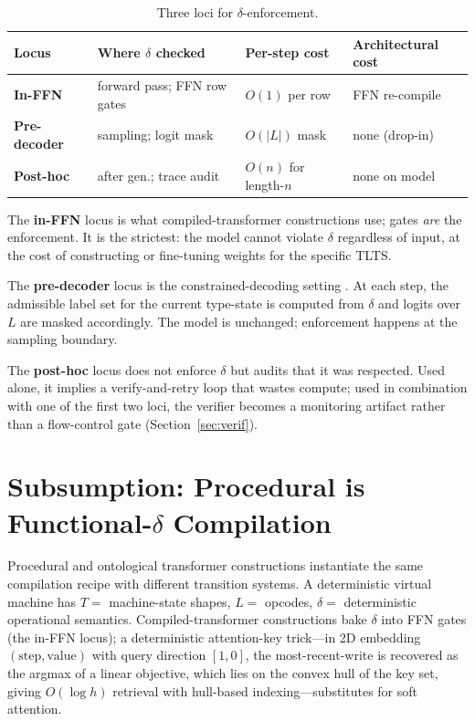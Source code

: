 \documentclass[preprint]{nesy2026}
\begin{document}
\begin{table}[h]
\centering
\small
\begin{tabular}{@{}llll@{}}
\toprule
Locus & Where $\delta$ checked & Per-step cost & Architectural cost \\
\midrule
\textbf{In-FFN} & forward pass; FFN row gates & $O(1)$ per row & FFN re-compile \\
\textbf{Pre-decoder} & sampling; logit mask & $O(|L|)$ mask & none (drop-in) \\
\textbf{Post-hoc} & after gen.; trace audit & $O(n)$ for length-$n$ & none on model \\
\bottomrule
\end{tabular}
\caption{Three loci for $\delta$-enforcement.}
\label{tab:loci}
\end{table}

The \textbf{in-FFN} locus is what compiled-transformer constructions
\citep{lindner2023tracr} use; gates \emph{are} the enforcement. It
is the strictest: the model cannot violate $\delta$ regardless of
input, at the cost of constructing or fine-tuning weights for the
specific TLTS.

The \textbf{pre-decoder} locus is the constrained-decoding setting
\citep{willard2023outlines, geng2023grammar}. At each step, the
admissible label set for the current type-state is computed from
$\delta$ and logits over $L$ are masked accordingly. The model is
unchanged; enforcement happens at the sampling boundary.

The \textbf{post-hoc} locus does not enforce $\delta$ but audits
that it was respected. Used alone, it implies a verify-and-retry
loop that wastes compute; used in combination with one of the first
two loci, the verifier becomes a monitoring artifact rather than a
flow-control gate (Section~\ref{sec:verif}).

\section{Subsumption: Procedural is Functional-$\delta$ Compilation}
\label{sec:subsumption}

Procedural and ontological transformer constructions instantiate the
same compilation recipe with different transition systems. A
deterministic virtual machine has $T = $ machine-state shapes,
$L = $ opcodes, $\delta = $ deterministic operational semantics.
Compiled-transformer constructions \citep{lindner2023tracr} bake
$\delta$ into FFN gates (the in-FFN locus); a deterministic
attention-key trick---in 2D embedding $(\text{step}, \text{value})$
with query direction $[1, 0]$, the most-recent-write is recovered as
the argmax of a linear objective, which lies on the convex hull of
the key set, giving $O(\log h)$ retrieval with hull-based
indexing---substitutes for soft attention.
\end{document}
